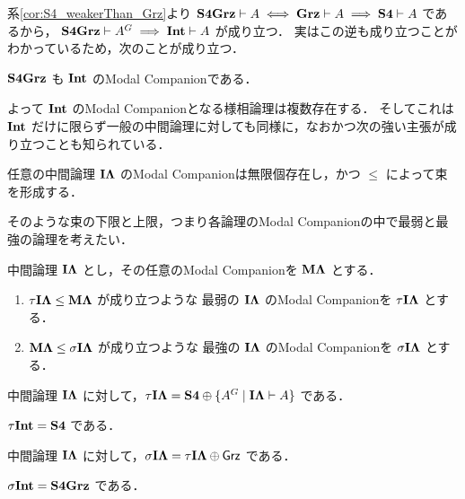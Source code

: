 \documentclass{jlreq}
\begin{document}
系\ref{cor:S4_weakerThan_Grz}より $\mathbf{S4Grz} \vdash A \iff \mathbf{Grz} \vdash A \implies \mathbf{S4} \vdash A$ であるから，
$\mathbf{S4Grz} \vdash A^G \implies \mathbf{Int} \vdash A$ が成り立つ．
実はこの逆も成り立つことがわかっているため，次のことが成り立つ．

\begin{theorem}
	$\mathbf{S4Grz}$ も $\mathbf{Int}$ のModal Companionである．
\end{theorem}

よって $\mathbf{Int}$ のModal Companionとなる様相論理は複数存在する．
そしてこれは $\mathbf{Int}$ だけに限らず一般の中間論理に対しても同様に，なおかつ次の強い主張が成り立つことも知られている．

\begin{theorem}
	任意の中間論理 $\mathbf{I\Lambda}$ のModal Companionは無限個存在し，かつ $\leq$ によって束を形成する．
\end{theorem}

そのような束の下限と上限，つまり各論理のModal Companionの中で最弱と最強の論理を考えたい．

\begin{definition}
	中間論理 $\mathbf{I\Lambda}$ とし，その任意のModal Companionを $\mathbf{M\Lambda}$ とする．

	\begin{enumerate}
		\item
		      $\tau\mathbf{I\Lambda} \leq \mathbf{M\Lambda}$ が成り立つような
		      最弱の $\mathbf{I\Lambda}$ のModal Companionを $\tau\mathbf{I\Lambda}$ とする．
		\item
		      $\mathbf{M\Lambda} \leq \sigma\mathbf{I\Lambda}$ が成り立つような
		      最強の $\mathbf{I\Lambda}$ のModal Companionを $\sigma\mathbf{I\Lambda}$ とする．
	\end{enumerate}
\end{definition}

\begin{theorem}
	中間論理 $\mathbf{I\Lambda}$ に対して，$\tau \mathbf{I\Lambda} = \mathbf{S4} \oplus \{ A^G \mid \mathbf{I\Lambda} \vdash A \} $ である．
\end{theorem}

\begin{corollary}
	$\tau \mathbf{Int} = \mathbf{S4}$ である．
\end{corollary}

\begin{theorem}
	中間論理 $\mathbf{I\Lambda}$ に対して，$\sigma \mathbf{I\Lambda} = \tau\mathbf{I\Lambda} \oplus \mathsf{Grz}$ である．
\end{theorem}

\begin{corollary}
	$\sigma \mathbf{Int} = \mathbf{S4Grz}$ である．
\end{corollary}

\printbibliography

\end{document}
